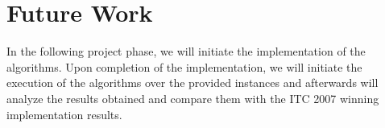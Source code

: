 \chapter{Future Work}
\label{future}
\thispagestyle{plain}

In the following project phase, we will initiate the implementation of the algorithms. Upon completion of the implementation, we will initiate the execution of the algorithms over the provided instances and afterwards will analyze the results obtained and compare them with the ITC 2007 winning implementation results.\\
